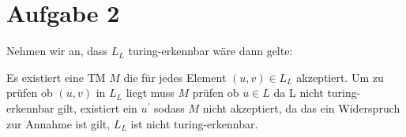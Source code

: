 \section*{Aufgabe 2}
Nehmen wir an, dass $L_L$ turing-erkennbar wäre dann gelte:


Es existiert eine TM $M$ die für jedes Element $(u,v) \in L_L$ akzeptiert. Um zu prüfen ob $(u,v)$ in $L_L$ liegt muss $M$ prüfen ob $u \in L$ da L nicht turing-erkennbar gilt, existiert ein $u^\prime$ sodass $M$ nicht akzeptiert, da das ein Widerspruch zur Annahme ist gilt,
$L_L$ ist nicht turing-erkennbar.
